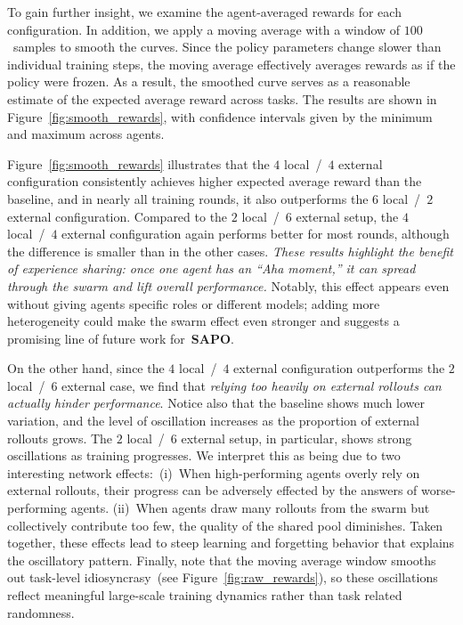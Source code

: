 \documentclass[11pt, a4paper, logo, singlecolumn, copyright]{gensyn}
\newcommand{\SAPO}{\textbf{SAPO}}
\begin{document}
To gain further insight, we examine the agent-averaged rewards for each configuration. In addition, we apply a moving average with a window of $100$~samples to smooth the curves. Since the policy parameters change slower than individual training steps, the moving average effectively averages rewards as if the policy were frozen. As a result, the smoothed curve serves as a reasonable estimate of the expected average reward across tasks. The results are shown in Figure~\ref{fig:smooth_rewards}, with confidence intervals given by the minimum and maximum across agents.

Figure~\ref{fig:smooth_rewards} illustrates that the $4$ local~/~$4$ external configuration consistently achieves higher expected average reward than the baseline, and in nearly all training rounds, it also outperforms the $6$ local~/~$2$ external configuration. Compared to the $2$ local~/~$6$ external setup, the $4$ local~/~$4$ external configuration again performs better for most rounds, although the difference is smaller than in the other cases. \textit{These results highlight the benefit of experience sharing: once one agent has an ``Aha moment,'' it can spread through the swarm and lift overall performance.} Notably, this effect appears even without giving agents specific roles or different models; adding more heterogeneity could make the swarm effect even stronger and suggests a promising line of future work for~\SAPO.

On the other hand, since the $4$ local~/~$4$ external configuration outperforms the $2$ local~/~$6$ external case, we find that \textit{relying too heavily on external rollouts can actually hinder performance}. Notice also that the baseline shows much lower variation, and the level of oscillation increases as the proportion of external rollouts grows. The $2$ local~/~$6$ external setup, in particular, shows strong oscillations as training progresses. We interpret this as being due to two interesting network effects:~(i)~When high-performing agents overly rely on external rollouts, their progress can be adversely effected by the answers of worse-performing agents. 
(ii)~When agents draw many rollouts from the swarm but collectively contribute too few, the quality of the shared pool diminishes.
Taken together, these effects lead to steep learning and forgetting behavior that explains the oscillatory pattern. 
Finally, note that the moving average window smooths out task-level idiosyncrasy~(see Figure~\ref{fig:raw_rewards}), so these oscillations reflect meaningful large-scale training dynamics rather than task related randomness.
\end{document}
